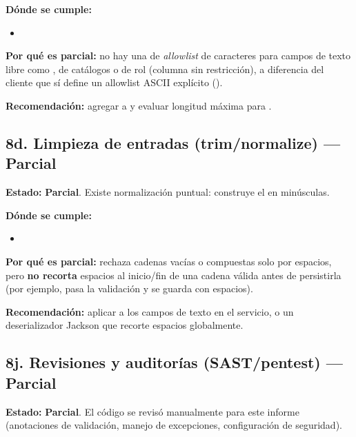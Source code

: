 \documentclass[11pt,a4paper]{article}
\newcommand{\Parcial}{\textcolor{parcialColor}{\textbf{Parcial}}}
\begin{document}
\textbf{Dónde se cumple:}
\begin{itemize}[leftmargin=1.2cm,nosep]
\item \texttt{}
\end{itemize}

\textbf{Por qué es parcial:} no hay una \texttt{} de \emph{allowlist} de caracteres para campos de texto libre como \texttt{}, \texttt{} de catálogos o \texttt{} de rol (columna \texttt{} sin restricción), a diferencia del cliente que sí define un allowlist ASCII explícito (\texttt{}).

\textbf{Recomendación:} agregar \texttt{} a \texttt{} y evaluar longitud máxima para \texttt{}.

\subsection{8d. Limpieza de entradas (trim/normalize) --- \Parcial}

\textbf{Estado:} \Parcial. Existe normalización puntual: \texttt{} construye el \texttt{} en minúsculas.

\textbf{Dónde se cumple:}
\begin{itemize}[leftmargin=1.2cm,nosep]
\item \texttt{}
\end{itemize}

\textbf{Por qué es parcial:} \texttt{} rechaza cadenas vacías o compuestas solo por espacios, pero \textbf{no recorta} espacios al inicio/fin de una cadena válida antes de persistirla (por ejemplo, \texttt{} pasa la validación y se guarda con espacios).

\textbf{Recomendación:} aplicar \texttt{} a los campos de texto en el servicio, o un deserializador Jackson que recorte espacios globalmente.

\subsection{8j. Revisiones y auditorías (SAST/pentest) --- \Parcial}

\textbf{Estado:} \Parcial. El código se revisó manualmente para este informe (anotaciones de validación, manejo de excepciones, configuración de seguridad).
\end{document}
